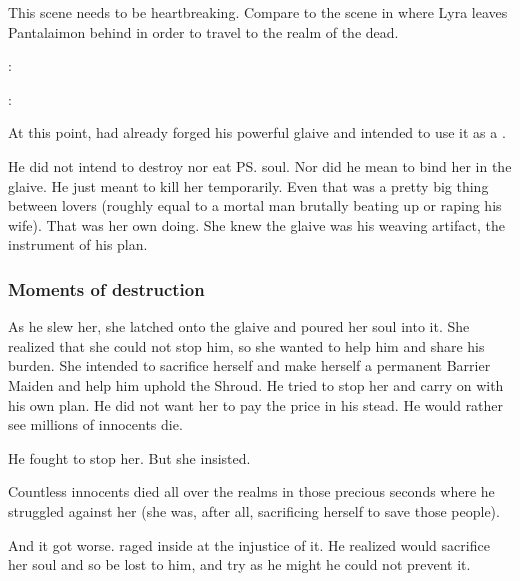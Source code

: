 This scene needs to be heartbreaking. 
Compare to the scene in \cite{PhillipPullman:TheAmberSpyglass} where Lyra leaves Pantalaimon behind in order to travel to the realm of the dead. 

\begin{prose}
  \Ishnaruchaefir:
  
  \Rystessakhin:
\end{prose}

At this point, \Ishnaruchaefir{} had already forged his powerful glaive and intended to use it as a . 

He did not intend to destroy nor eat \ps{\Aeocrith} soul. 
Nor did he mean to bind her in the glaive. 
He just meant to kill her temporarily. 
Even that was a pretty big thing between lovers (roughly equal to a mortal man brutally beating up or raping his wife). 
That was her own doing. 
She knew the glaive was his weaving artifact, the instrument of his plan.





\subsubsection{Moments of destruction}
As he slew her, she latched onto the glaive and poured her soul into it. 
She realized that she could not stop him, so she wanted to help him and share his burden. 
She intended to sacrifice herself and make herself a permanent Barrier Maiden and help him uphold the Shroud. 
He tried to stop her and carry on with his own plan. 
He did not want her to pay the price in his stead. 
He would rather see millions of innocents die. 

He fought to stop her. 
But she insisted. 

Countless innocents died all over the realms in those precious seconds where he struggled against her (she was, after all, sacrificing herself to save those people). 

And it got worse. 
\Ishnaruchaefir{} raged inside at the injustice of it. 
He realized \Rystessakhin{} would sacrifice her soul and so be lost to him, and try as he might he could not prevent it. 

\begin{prose}
\end{prose}

